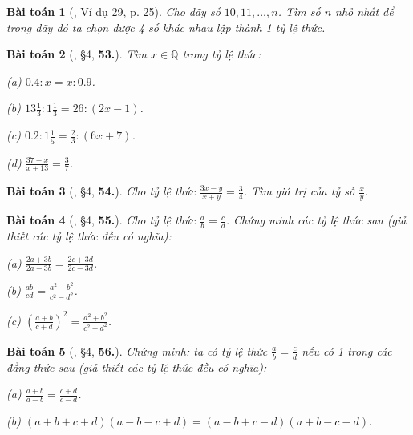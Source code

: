 \documentclass{article}
\numberwithin{equation}{section}
\newtheorem{baitoan}{Bài toán}
\begin{document}
\begin{baitoan}[\cite{Binh_Toan_7_tap_1}, Ví dụ 29, p. 25]
	Cho dãy số $10,11,\ldots,n$. Tìm số $n$ nhỏ nhất để trong dãy đó ta chọn được 4 số khác nhau lập thành 1 tỷ lệ thức.
\end{baitoan}

\begin{baitoan}[\cite{Binh_Toan_7_tap_1}, \S4, \textbf{53.}]
	Tìm $x\in\mathbb{Q}$ trong tỷ lệ thức:
	\begin{enumerate*}
		\item[(a)] $0.4:x = x:0.9$.
		\item[(b)] $13\frac{1}{3}:1\frac{1}{3} = 26:(2x - 1)$.
		\item[(c)] $0.2:1\frac{1}{5} = \frac{2}{3}:(6x + 7)$.
		\item[(d)] $\frac{37 - x}{x + 13} = \frac{3}{7}$.
	\end{enumerate*}
\end{baitoan}

\begin{baitoan}[\cite{Binh_Toan_7_tap_1}, \S4, \textbf{54.}]
	Cho tỷ lệ thức $\frac{3x - y}{x + y} = \frac{3}{4}$. Tìm giá trị của tỷ số $\frac{x}{y}$.
\end{baitoan}

\begin{baitoan}[\cite{Binh_Toan_7_tap_1}, \S4, \textbf{55.}]
	Cho tỷ lệ thức $\frac{a}{b} = \frac{c}{d}$. Chứng minh các tỷ lệ thức sau (giả thiết các tỷ lệ thức đều có nghĩa):
	\begin{enumerate*}
		\item[(a)] $\frac{2a + 3b}{2a - 3b} = \frac{2c + 3d}{2c - 3d}$.
		\item[(b)] $\frac{ab}{cd} = \frac{a^2 - b^2}{c^2 - d^2}$.
		\item[(c)] $\left(\frac{a + b}{c + d}\right)^2 = \frac{a^2 + b^2}{c^2 + d^2}$.
	\end{enumerate*}
\end{baitoan}

\begin{baitoan}[\cite{Binh_Toan_7_tap_1}, \S4, \textbf{56.}]
	Chứng minh: ta có tỷ lệ thức $\frac{a}{b} = \frac{c}{d}$ nếu có 1 trong các đẳng thức sau (giả thiết các tỷ lệ thức đều có nghĩa):
	\begin{enumerate*}
		\item[(a)] $\frac{a + b}{a - b} = \frac{c + d}{c - d}$.
		\item[(b)] $(a + b + c + d)(a - b - c + d) = (a - b + c - d)(a + b - c - d)$.
	\end{enumerate*}
\end{baitoan}
\end{document}
